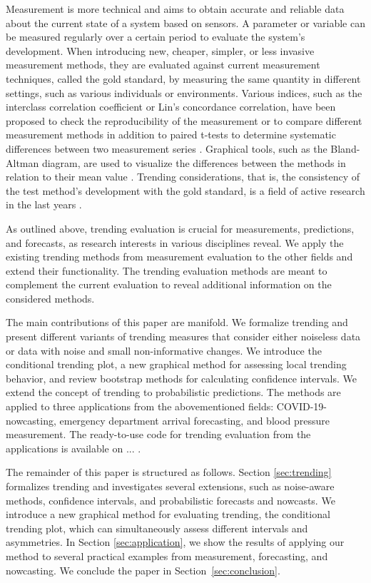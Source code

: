 Measurement is more technical and aims to obtain accurate and reliable data about the current state of a system based on sensors. 
A parameter or variable can be measured regularly over a certain period to evaluate the system's development.
When introducing new, cheaper, simpler, or less invasive measurement methods, they are evaluated against current measurement techniques, called the gold standard, by measuring the same quantity in different settings, such as various individuals or environments.
Various indices, such as the interclass correlation coefficient or Lin's concordance correlation, have been proposed to check the reproducibility of the measurement or to compare different measurement methods \citep{lawrence1989concordance,koo2016guideline} in addition to paired t-tests to determine systematic differences between two measurement series \citep{watson2010method}. 
Graphical tools, such as the Bland-Altman diagram, are used to visualize the differences between the methods in relation to their mean value \citep{bland1986statistical}. 
Trending considerations, that is, the consistency of the test method's development with the gold standard, is a field of active research in the last years \citep{Saugel2015,saugel2018error,hiraishi2021concordance}. 

As outlined above, trending evaluation is crucial for measurements, predictions, and forecasts, as research interests in various disciplines reveal. 
We apply the existing trending methods from measurement evaluation to the other fields and extend their functionality.
The trending evaluation methods are meant to complement the current evaluation to reveal additional information on the considered methods.

The main contributions of this paper are manifold.
We formalize trending and present different variants of trending measures that consider either noiseless data or data with noise and small non-informative changes.
We introduce the conditional trending plot, a new graphical method for assessing local trending behavior, and review bootstrap methods for calculating confidence intervals.
We extend the concept of trending to probabilistic predictions.
The methods are applied to three applications from the abovementioned fields: COVID-19-nowcasting, emergency department arrival forecasting, and blood pressure measurement.
The ready-to-use code for trending evaluation from the applications is available on ... .

The remainder of this paper is structured as follows. 
Section \ref{sec:trending} formalizes trending and investigates several extensions, such as noise-aware methods, confidence intervals, and probabilistic forecasts and nowcasts. 
We introduce a new graphical method for evaluating trending, the conditional trending plot, which can simultaneously assess different intervals and asymmetries. 
In Section \ref{sec:application}, we show the results of applying our method to several practical examples from measurement, forecasting, and nowcasting. 
We conclude the paper in Section~\ref{sec:conclusion}.
